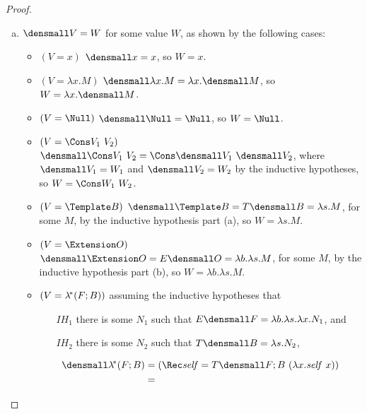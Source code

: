 \begin{proof}
\begin{enumerate}[(a)]
\begin{itemize}
    \end{itemize}
  \item $\den{V} = W$ for some value $W$, as shown by the following cases:
    \begin{itemize}
    \item $(V = x)$
      $\den{x} = x$, so $W=x$.
    \item $(V = \lambda x. M)$
      $\den{\lambda x. M} = \lambda x. \den{M}$, so $W = \lambda x. \den{M}$.
    \item $(V = \Null)$
      $\den{\Null} = \Null$, so $W=\Null$.
    \item $(V = \Cons V_1 ~ V_2)$
      $\den{\Cons V_1 ~ V_2} = \Cons \den{V_1} ~ \den{V_2}$,
      where $\den{V_1} = W_1$ and $\den{V_2} = W_2$ by the inductive hypotheses,
      so $W = \Cons W_1 ~ W_2$.
    \item $(V = \Template B)$
      $\den{\Template B} = T\den{B} = \lambda s. M$, for some $M$,
      by the inductive hypothesis part (a),
      so $W = \lambda s. M$.
    \item $(V = \Extension O)$
      $\den{\Extension O} = E\den{O} = \lambda b. \lambda s. M$, for some $M$,
      by the inductive hypothesis part (b),
      so $W = \lambda b. \lambda s. M$.
    \item $(V = \lambda^{\!*} (F; B))$
      assuming the inductive hypotheses that 
      \begin{itemize}
      \item[$IH_1$] there is some $N_1$ such that
        $E\den{F} = \lambda b. \lambda s. \lambda x. N_1$, and
      \item[$IH_2$] there is some $N_2$ such that
        $T\den{B} = \lambda s. N_2$,
      \end{itemize}
      \begin{align*}
        \den{\lamstar (F; B)}
        &=
        (\Rec \mathit{self} = T\den{F; B} ~ (\lambda x. \mathit{self} ~ x))
        \\
        &=

\end{align*}
\end{itemize}
\end{enumerate}
\end{proof}
